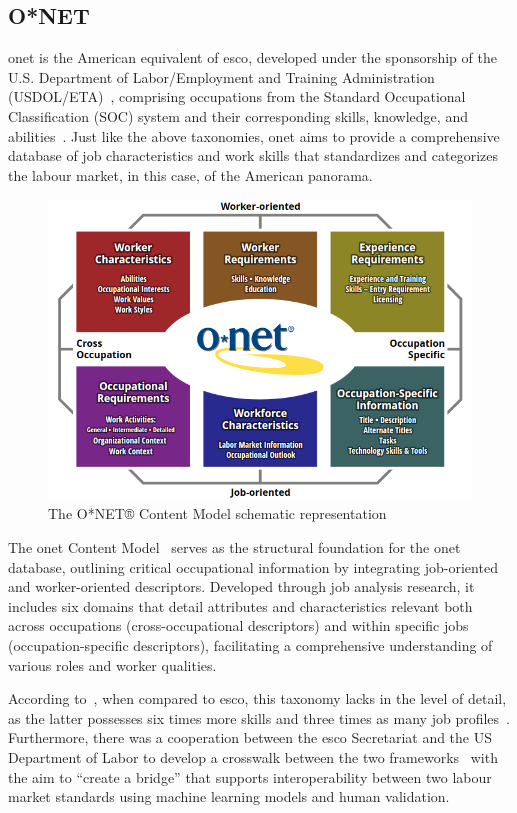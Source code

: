 \subsection{O*NET}
\ac{onet} is the American equivalent of \ac{esco}, developed under the sponsorship of the U.S. Department of Labor/Employment and Training Administration (USDOL/ETA)~\cite{esco_onet_crosswalk}, comprising occupations from the Standard Occupational Classification (SOC) system and their corresponding skills, knowledge, and abilities~\cite{Fareri_2021}.
Just like the above taxonomies, \ac{onet} aims to provide a comprehensive database of job characteristics and work skills that standardizes and categorizes the labour market, in this case, of the American panorama.

\begin{figure}[H]
    \centering
    \includegraphics[width=15cm]{figs/onet_content_model.png}
    \caption{The O*NET® Content Model schematic representation~\cite{onet_content}}
    \label{fig:onet_content}
\end{figure}

The \ac{onet} Content Model~\cite{onet_content} serves as the structural foundation for the \ac{onet} database, outlining critical occupational information by integrating job-oriented and worker-oriented descriptors. Developed through job analysis research, it includes six domains that detail attributes and characteristics relevant both across occupations (cross-occupational descriptors) and within specific jobs (occupation-specific descriptors), facilitating a comprehensive understanding of various roles and worker qualities.

According to~\citeauthor{Fareri_2021}, when compared to \ac{esco}, this taxonomy lacks in the level of detail, as the latter possesses six times more skills and three times as many job profiles~\cite{Fareri_2021}.
Furthermore, there was a cooperation between the \ac{esco} Secretariat and the US Department of Labor to develop a crosswalk between the two frameworks~\cite{esco_onet_crosswalk} with the aim to “create a bridge” that supports interoperability between two labour market standards using machine learning models and human validation.

